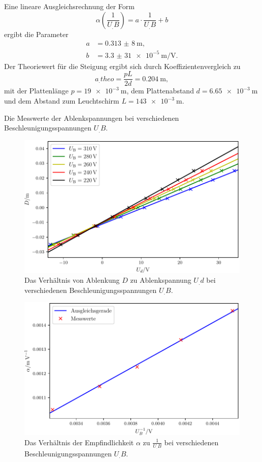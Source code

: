 Eine lineare Ausgleichsrechnung der Form
\[\alpha\left(\frac{1}{U_.B}\right)=a\cdot\frac{1}{U_.B}+b\]
ergibt die Parameter
\begin{align*}
a&=\SI{0,313(8)}{\metre},\\
b&=\SI{3,3(31)e-5}{\metre\per\volt}\text{.}
\end{align*}
Der Theoriewert für die Steigung ergibt sich durch Koeffizientenvergleich zu
\[
a_.{theo}=\frac{pL}{2d}=\SI{0,204}{\metre},
\]
mit der Plattenlänge $p=\SI{19e-3}{\metre}$, dem Plattenabstand $d=\SI{6,65e-3}{\metre}$ und dem Abstand zum Leuchtschirm $L=\SI{143e-3}{\metre}$\cite{V501}.
\begin{table}
\centering
\caption{Die Messwerte der Ablenkspannungen bei verschiedenen Beschleunigungsspannungen $U_.B$.}

\label{tab:Elek}
\end{table}
\begin{figure}
\centering
\includegraphics[width=\linewidth-70pt,height=\textheight-70pt,keepaspectratio]{content/images/GraphEle.pdf}
\caption{Das Verhältnis von Ablenkung $D$ zu Ablenkspannung $U_.d$ bei verschiedenen Beschleunigungsspannungen $U_.B$.}\label{fig:Elek}
\end{figure}
\begin{figure}
\centering
\includegraphics[width=\linewidth-70pt,height=\textheight-70pt,keepaspectratio]{content/images/GraphEle6.pdf}
\caption{Das Verhältnis der Empfindlichkeit $\alpha$ zu $\frac{1}{U_.B}$ bei verschiedenen Beschleunigungsspannungen $U_.B$.}\label{fig:Elek2}
\end{figure}

